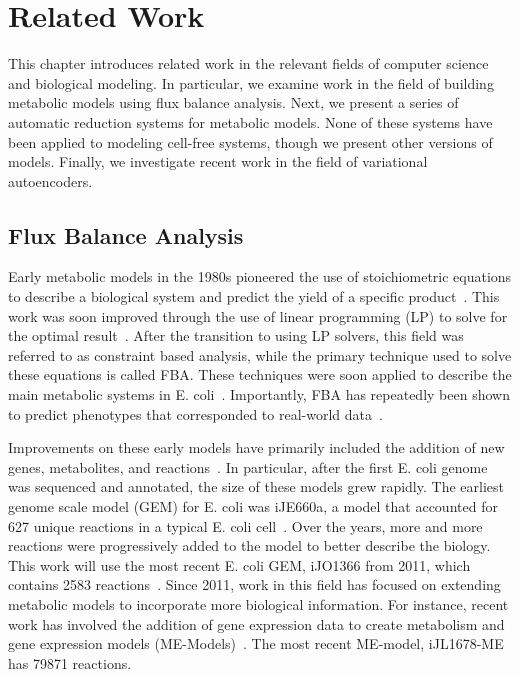 \chapter{Related Work} \label{chap:rw}
This chapter introduces related work in the relevant fields of computer science and biological modeling.
In particular, we examine work in the field of building metabolic models using flux balance analysis.
Next, we present a series of automatic reduction systems for metabolic models.
None of these systems have been applied to modeling cell-free systems, though we present other versions of models.
Finally, we investigate recent work in the field of variational autoencoders.

\section{Flux Balance Analysis}
Early metabolic models in the 1980s pioneered the use of stoichiometric equations to describe a biological system and predict the yield of a specific product~\cite{papoutsakis1984equations}.
This work was soon improved through the use of linear programming (LP) to solve for the optimal result~\cite{fell1986fat}.
After the transition to using LP solvers, this field was referred to as constraint based analysis, while the primary technique used to solve these equations is called FBA.
These techniques were soon applied to describe the main metabolic systems in E. coli~\cite{majewski1990simple}.
Importantly, FBA has repeatedly been shown to predict phenotypes that corresponded to real-world data~\cite{varma1994stoichiometric, edwards2001silico, segre2002analysis, bordbar2014constraint}.

Improvements on these early models have primarily included the addition of new genes, metabolites, and reactions~\cite{varma1993metabolic}.
In particular, after the first E. coli genome was sequenced and annotated, the size of these models grew rapidly.
The earliest genome scale model (GEM) for E. coli was iJE660a, a model that accounted for 627 unique reactions in a typical E. coli cell~\cite{edwards2000escherichia}.
Over the years, more and more reactions were progressively added to the model to better describe the biology.
This work will use the most recent E. coli GEM, iJO1366 from 2011, which contains 2583 reactions~\cite{orth2011comprehensive}.
Since 2011, work in this field has focused on extending metabolic models to incorporate more biological information.
For instance, recent work has involved the addition of gene expression data to create metabolism and gene expression models (ME-Models)~\cite{lloyd2017cobrame}.
The most recent ME-model, iJL1678-ME has 79871 reactions.

